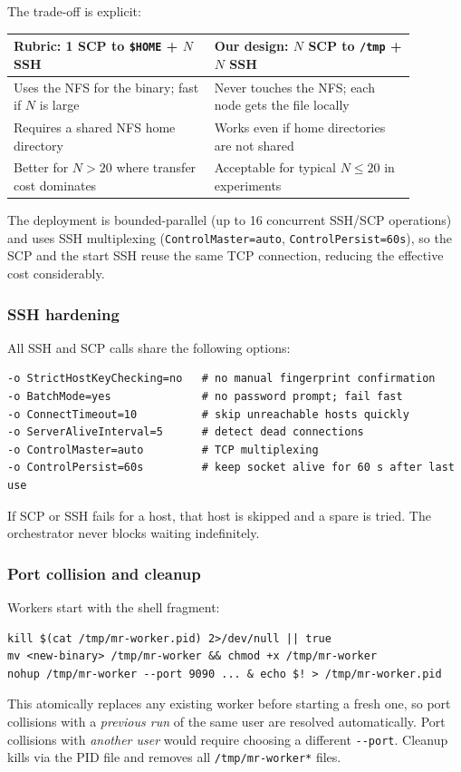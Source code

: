 \documentclass[11pt,a4paper]{article}
\begin{document}
The trade-off is explicit:

\begin{center}\small
\begin{tabular}{p{0.44\linewidth} p{0.44\linewidth}}
\toprule
Rubric: 1 SCP to \texttt{\$HOME} + \(N\) SSH & Our design: \(N\) SCP to \texttt{/tmp} + \(N\) SSH \\
\midrule
Uses the NFS for the binary; fast if \(N\) is large & Never touches the NFS; each node gets the file locally \\
Requires a shared NFS home directory & Works even if home directories are not shared \\
Better for \(N > 20\) where transfer cost dominates & Acceptable for typical \(N \leq 20\) in experiments \\
\bottomrule
\end{tabular}
\end{center}

The deployment is bounded-parallel (up to 16 concurrent SSH/SCP operations)
and uses SSH multiplexing (\texttt{ControlMaster=auto},
\texttt{ControlPersist=60s}), so the SCP and the start SSH reuse the same TCP
connection, reducing the effective cost considerably.

\subsubsection{SSH hardening}

All SSH and SCP calls share the following options:
\begin{lstlisting}[style=codeblock]
-o StrictHostKeyChecking=no   # no manual fingerprint confirmation
-o BatchMode=yes              # no password prompt; fail fast
-o ConnectTimeout=10          # skip unreachable hosts quickly
-o ServerAliveInterval=5      # detect dead connections
-o ControlMaster=auto         # TCP multiplexing
-o ControlPersist=60s         # keep socket alive for 60 s after last use
\end{lstlisting}
If SCP or SSH fails for a host, that host is skipped and a spare is tried.
The orchestrator never blocks waiting indefinitely.

\subsubsection{Port collision and cleanup}

Workers start with the shell fragment:
\begin{lstlisting}[style=codeblock]
kill $(cat /tmp/mr-worker.pid) 2>/dev/null || true
mv <new-binary> /tmp/mr-worker && chmod +x /tmp/mr-worker
nohup /tmp/mr-worker --port 9090 ... & echo $! > /tmp/mr-worker.pid
\end{lstlisting}
This atomically replaces any existing worker before starting a fresh one, so
port collisions with a \emph{previous run} of the same user are resolved
automatically. Port collisions with \emph{another user} would require
choosing a different \texttt{-{}-port}. Cleanup kills via the PID file and
removes all \texttt{/tmp/mr-worker*} files.
\end{document}
